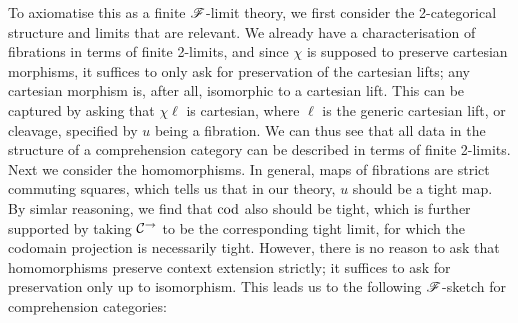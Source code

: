 \documentclass[../thesis.tex]{subfiles}
\begin{document}
To axiomatise this as a finite ${\mathscr{F}}$-limit theory, we first consider the 2-categorical structure and limits that
are relevant. We already have a characterisation of fibrations in terms of finite 2-limits, and since $\chi$ is
supposed to preserve cartesian morphisms, it suffices to only ask for preservation of the cartesian lifts; any
cartesian morphism is, after all, isomorphic to a cartesian lift. This can be captured by asking that $\chi\ell$
is cartesian, where $\ell$ is the generic cartesian lift, or cleavage, specified by $u$ being a fibration. We can
thus see that all data in the structure of a comprehension category can be described in terms of finite 2-limits.
Next we consider the homomorphisms. In general, maps of fibrations are strict commuting squares, which tells us
that in our theory, $u$ should be a tight map. By simlar reasoning, we find that ${\mathrm{cod}}$ also should be tight, which
is further supported by taking ${\mathcal{C}}^\to$ to be the corresponding tight limit, for which the codomain projection is
necessarily tight. However, there
is no reason to ask that homomorphisms preserve context extension strictly; it suffices to ask for preservation
only up to isomorphism. This leads us to the following ${\mathscr{F}}$-sketch for comprehension categories:
\end{document}

